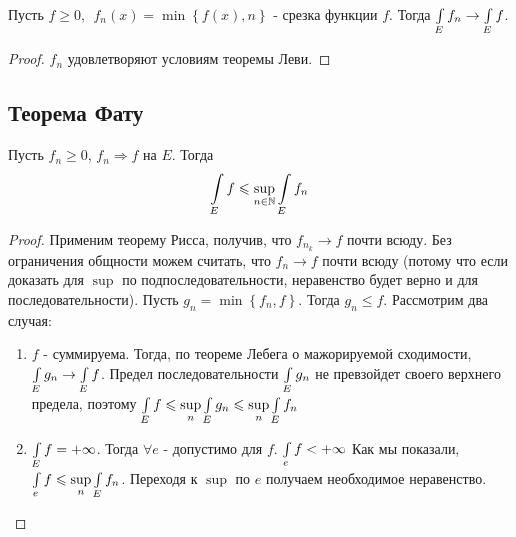 \begin{corollary}
	Пусть $f \geqslant 0,  \:\: f_n(x) = \min\left\{f(x), n\right\}$ - срезка функции $f$. Тогда $\int\limits_{E} f_n \rightarrow \int\limits_{E} f$.
\end{corollary}

\begin{proof}
	$f_n$ удовлетворяют условиям теоремы Леви.
\end{proof}

\subsection{Теорема Фату}

\begin{theorem}
	Пусть $f_n \geqslant 0$, $f_n \Rightarrow f$ на $E$. Тогда \[\int\limits_{E} f \leqslant \sup\limits_{n \in \mathbb{N}} \int\limits_{E} f_n	\]
\end{theorem}

\begin{proof}
	Применим теорему Рисса, получив, что $f_{n_k} \rightarrow f$ почти всюду. Без ограничения общности можем считать, что $f_n \rightarrow f$ почти всюду
	(потому что если доказать для $\sup$ по подпоследовательности, неравенство будет верно и для последовательности).
	Пусть $g_n = \min\left\{f_n, f\right\}$. Тогда $g_n \leqslant f$.
	Рассмотрим два случая:
	\begin{enumerate}
		\item 
			$f$ - суммируема.
			Тогда, по теореме Лебега о мажорируемой сходимости, $\int\limits_{E} g_n \rightarrow \int\limits_{E} f$. Предел последовательности $\int\limits_{E} g_n$ не превзойдет своего верхнего предела, 
			поэтому $\int\limits_{E} f \leqslant \sup\limits_{n} \int\limits_{E} g_n \leqslant \sup\limits_{n}\int\limits_{E} f_n$
		\item
			$\int\limits_{E} f = +\infty$. Тогда $\forall e$ - допустимо для $f$. $\int\limits_{e} f < +\infty$
			Как мы показали, $\int\limits_{e} f \leqslant \sup\limits_{n}\int\limits_{E} f_n$. Переходя к $\sup$ по $e$ получаем необходимое неравенство.
	\end{enumerate}
\end{proof}

\newpage
